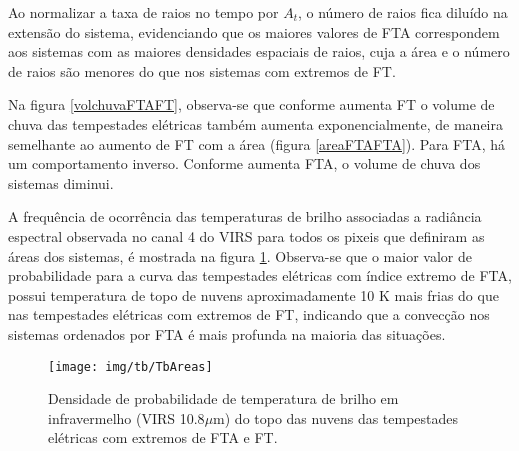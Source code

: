 
Ao normalizar a taxa de raios no tempo por $A_t$, o número de raios fica diluído na extensão do sistema, evidenciando que os maiores valores de FTA correspondem aos sistemas com as maiores densidades espaciais de raios, cuja a área e o número de raios são menores do que nos sistemas com extremos de FT.

Na figura \ref{volchuvaFTAFT}, observa-se que conforme aumenta FT o volume de chuva das tempestades elétricas também aumenta exponencialmente, de maneira semelhante ao aumento de FT com a área (figura \ref{areaFTAFTA}). Para FTA, há um comportamento inverso. Conforme aumenta FTA, o volume de chuva dos sistemas diminui.  

A frequência de ocorrência das temperaturas de brilho associadas a radiância espectral observada no canal 4 do VIRS para todos os pixeis que definiram as áreas dos sistemas, é mostrada na figura \ref{tb}. Observa-se que o maior valor de probabilidade para a curva das tempestades elétricas com índice extremo de FTA, possui temperatura de topo de nuvens aproximadamente 10 K mais frias do que nas tempestades elétricas com extremos de FT, indicando que a convecção nos sistemas ordenados por FTA é mais profunda na maioria das situações.



\begin{figure}[!ht]
  \centering 
  \texttt{[image: img/tb/TbAreas]}
  \caption{Densidade de probabilidade de temperatura de brilho em infravermelho (VIRS 10.8$\mu$m) do topo das nuvens das tempestades elétricas com extremos de FTA e FT.}
  \label{tb}
\end{figure}

